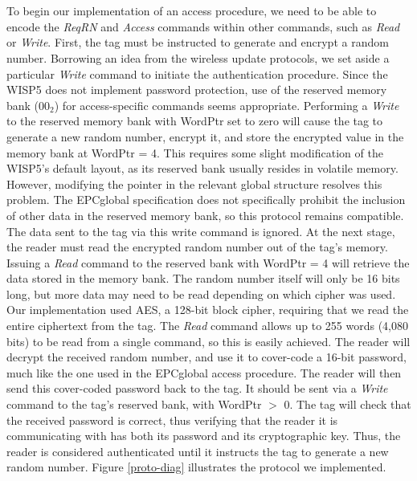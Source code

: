 \documentclass[journal]{IEEEtran}
\begin{document}
        \\\\
        To begin our implementation of an access procedure, we need to be able to encode the \textit{ReqRN} and \textit{Access} commands within other commands, such as \textit{Read} or \textit{Write}.
        First, the tag must be instructed to generate and encrypt a random number.
        Borrowing an idea from the wireless update protocols, we set aside a particular \textit{Write} command to initiate the authentication procedure.
        Since the WISP5 does not implement password protection, use of the reserved memory bank ($00_2$) for access-specific commands seems appropriate.
        Performing a \textit{Write} to the reserved memory bank with WordPtr set to zero will cause the tag to generate a new random number, encrypt it, and store the encrypted value in the memory bank at WordPtr = 4.
        This requires some slight modification of the WISP5's default layout, as its reserved bank usually resides in volatile memory.
        However, modifying the pointer in the relevant global structure resolves this problem.
        The EPCglobal specification does not specifically prohibit the inclusion of other data in the reserved memory bank, so this protocol remains compatible.
        The data sent to the tag via this write command is ignored.
        At the next stage, the reader must read the encrypted random number out of the tag's memory.
        Issuing a \textit{Read} command to the reserved bank with WordPtr = 4 will retrieve the data stored in the memory bank.
        The random number itself will only be 16 bits long, but more data may need to be read depending on which cipher was used.
        Our implementation used AES, a 128-bit block cipher, requiring that we read the entire ciphertext from the tag.
        The \textit{Read} command allows up to 255 words (4,080 bits) to be read from a single command, so this is easily achieved.
        The reader will decrypt the received random number, and use it to cover-code a 16-bit password, much like the one used in the EPCglobal access procedure.
        The reader will then send this cover-coded password back to the tag.
        It should be sent via a \textit{Write} command to the tag's reserved bank, with WordPtr $>$ 0.
        The tag will check that the received password is correct, thus verifying that the reader it is communicating with has both its password and its cryptographic key.
        Thus, the reader is considered authenticated until it instructs the tag to generate a new random number.
        Figure \ref{proto-diag} illustrates the protocol we implemented.
\end{document}
